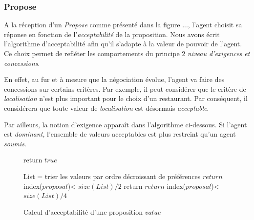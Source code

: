 		\subsubsection{Propose}
			A la réception d'un \emph{Propose} comme présenté dans la figure ..., l'agent choisit sa réponse en fonction de l'\emph{acceptabilité} de la proposition.
			Nous avons écrit l'algorithme d'acceptabilité afin qu'il s'adapte à la valeur de pouvoir de l'agent. Ce choix permet de refléter les comportements du principe 2 \emph{niveau d'exigences et concessions}.
			
			En effet, au fur et à mesure que la négociation évolue, l'agent va faire des concessions sur certains critères. Par exemple, il peut considérer que le critère de \emph{localisation} n'est plus important pour le choix d'un restaurant. Par conséquent, il considérera que toute valeur de \emph{localisation} est désormais \emph{acceptable}.
			
			Par ailleurs, la notion d'exigence apparaît dans l'algorithme ci-dessous. Si l'agent est \emph{dominant}, l'ensemble de valeurs acceptables est plus restreint qu'un agent \emph{soumis}.
			
			\begin{figure}[]
				\begin{algorithmic}[1]\small
					\State return $true$
					\EndIf
					
					\State List = trier les valeurs par ordre décroissant de préférences
					\State $return$ index($proposal$)< $size(List)/2$
					\EndIf
					\State return $return$ index($proposal$)< $size(List)/4$
					\EndIf
					\EndFunction
				\end{algorithmic}
				\vskip 8pt
				\label{pseudo}
				\caption{Calcul d'acceptabilité d'une proposition $value$}
			\end{figure} 
			
